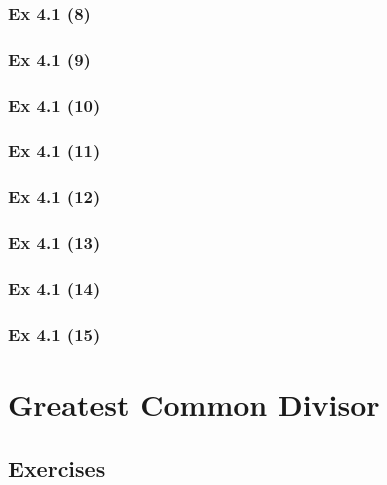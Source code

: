 \subsubsection{Ex 4.1 (8)}\label{sec:Ex_4.1.8}

\subsubsection{Ex 4.1 (9)}\label{sec:Ex_4.1.9}

\subsubsection{Ex 4.1 (10)}\label{sec:Ex_4.1.10}

\newpage		%

\subsubsection{Ex 4.1 (11)}\label{sec:Ex_4.1.11}

\subsubsection{Ex 4.1 (12)}\label{sec:Ex_4.1.12}

\subsubsection{Ex 4.1 (13)}\label{sec:Ex_4.1.13}

\subsubsection{Ex 4.1 (14)}\label{sec:Ex_4.1.14}

\subsubsection{Ex 4.1 (15)}\label{sec:Ex_4.1.15}

\newpage		%

\section{Greatest Common Divisor}\label{sec:4.2}
\subsection{Exercises}\label{sec:4.2_Exercises}

